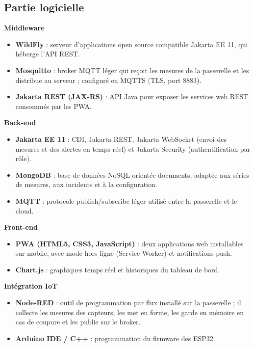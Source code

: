 \documentclass[11pt,a4paper]{article}
\begin{document}
\subsection{Partie logicielle}

\textbf{Middleware}
\begin{itemize}
  \item \textbf{WildFly} : serveur d'applications open source compatible Jakarta EE 11, qui héberge l'API REST.
  \item \textbf{Mosquitto} : broker MQTT léger qui reçoit les mesures de la passerelle et les distribue au serveur ; configuré en MQTTS (TLS, port 8883).
  \item \textbf{Jakarta REST (JAX-RS)} : API Java pour exposer les services web REST consommés par les PWA.
\end{itemize}

\textbf{Back-end}
\begin{itemize}
  \item \textbf{Jakarta EE 11} : CDI, Jakarta REST, Jakarta WebSocket (envoi des mesures et des alertes en temps réel) et Jakarta Security (authentification par rôle).
  \item \textbf{MongoDB} : base de données NoSQL orientée documents, adaptée aux séries de mesures, aux incidents et à la configuration.
  \item \textbf{MQTT} : protocole publish/subscribe léger utilisé entre la passerelle et le cloud.
\end{itemize}

\textbf{Front-end}
\begin{itemize}
  \item \textbf{PWA (HTML5, CSS3, JavaScript)} : deux applications web installables sur mobile, avec mode hors ligne (Service Worker) et notifications push.
  \item \textbf{Chart.js} : graphiques temps réel et historiques du tableau de bord.
\end{itemize}

\textbf{Intégration IoT}
\begin{itemize}
  \item \textbf{Node-RED} : outil de programmation par flux installé sur la passerelle ; il collecte les mesures des capteurs, les met en forme, les garde en mémoire en cas de coupure et les publie sur le broker.
  \item \textbf{Arduino IDE / C++} : programmation du firmware des ESP32.
\end{itemize}
\end{document}
